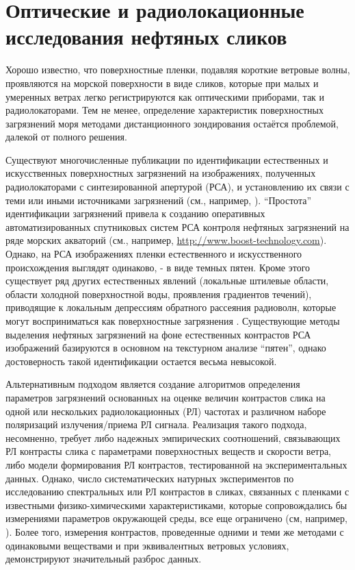 \chapter{Оптические и радиолокационные исследования нефтяных сликов} \label{chap:2}


Хорошо известно, что поверхностные пленки, подавляя короткие ветровые волны, проявляются на морской поверхности в виде сликов, которые при малых и умеренных ветрах легко регистрируются как оптическими приборами, так и радиолокаторами. Тем не менее, определение характеристик поверхностных загрязнений моря методами дистанционного зондирования остаётся проблемой, далекой от полного решения.

Существуют многочисленные публикации по идентификации естественных и искусственных поверхностных загрязнений на изображениях, полученных радиолокаторами с синтезированной апертурой (РСА), и установлению их связи с теми или иными источниками загрязнений (см., например, \citep{Gade1998, Espedal1996, Espedal1998, Espedal2000}). ``Простота'' идентификации загрязнений привела к созданию оперативных автоматизированных спутниковых систем РСА контроля нефтяных загрязнений на ряде морских акваторий (см., например, \url{http://www.boost-technology.com}). Однако, на РСА изображениях пленки естественного и искусственного происхождения выглядят одинаково, - в виде темных пятен. Кроме этого существует ряд других естественных явлений (локальные штилевые области, области холодной поверхностной воды, проявления градиентов течений), приводящие к локальным депрессиям обратного рассеяния радиоволн, которые могут восприниматься как поверхностные загрязнения \citep{Espedal2000, Kudryavtsev2003}. Существующие методы выделения нефтяных загрязнений на фоне естественных контрастов РСА изображений базируются в основном на текстурном анализе ``пятен'', однако достоверность такой идентификации остается весьма невысокой.

Альтернативным подходом является создание алгоритмов определения параметров загрязнений основанных на оценке величин контрастов слика на одной или нескольких радиолокационных (РЛ) частотах \citep{Ermakov1987} и различном наборе поляризаций излучения/приема РЛ сигнала. Реализация такого подхода, несомненно, требует либо надежных эмпирических соотношений, связывающих РЛ контрасты слика с параметрами поверхностных веществ и скорости ветра, либо модели формирования РЛ контрастов, тестированной на экспериментальных данных. Однако, число систематических натурных экспериментов по исследованию спектральных или РЛ контрастов в сликах, связанных с пленками с известными физико-химическими характеристиками, которые сопровождались бы измерениями параметров окружающей среды, все еще ограничено (см, например, \citep{Ermakov1986, Ermakov1992, Gade1998, Gade1998b}). Более того, измерения контрастов, проведенные одними и теми же методами с одинаковыми веществами и при эквивалентных ветровых условиях, демонстрируют значительный разброс данных.

